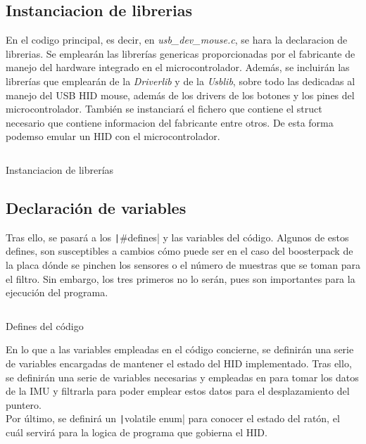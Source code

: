 \documentclass[a4paper,twoside]{article}
\begin{document}
\subsection{Instanciacion de librerias}
En el codigo principal, es decir, en \textit{usb\_dev\_mouse.c}, se hara la declaracion de librerias. Se emplearán las librerías genericas proporcionadas por el fabricante de manejo del hardware integrado en el microcontrolador. Además, se incluirán las librerías que emplearán de la \textit{Driverlib} y de la \textit{Usblib}, sobre todo las dedicadas al manejo del USB HID mouse, además de los drivers de los botones y los pines del microcontrolador. También se instanciará el fichero que contiene el struct necesario que contiene informacion del fabricante entre otros. De esta forma podemso emular un HID con el microcontrolador.
\begin{listing}[h!]
\inputminted[linenos,breaklines,frame=lines,framesep=2mm]{c}{codes/librerias.c}
\caption{Instanciacion de librerías}
\end{listing}

\newpage
\subsection{Declaración de variables}
Tras ello, se pasará a los \texttt|#defines| y las variables del código. Algunos de estos defines, son susceptibles a cambios cómo puede ser en el caso del boosterpack de la placa dónde se pinchen los sensores o el número de muestras que se toman para el filtro. Sin embargo, los tres primeros no lo serán, pues son importantes para la ejecución del programa.
\begin{listing}[h!]
\inputminted[linenos,breaklines,frame=lines,framesep=2mm]{c}{codes/defines.c}
\caption{Defines del código}
\end{listing}

En lo que a las variables empleadas en el código concierne, se definirán una serie de variables encargadas de mantener el estado del HID implementado. Tras ello, se definirán una serie de variables necesarias y empleadas en para tomar los datos de la IMU y filtrarla para poder emplear estos datos para el desplazamiento del puntero.\\
Por último, se definirá un \texttt|volatile enum| para conocer el estado del ratón, el cuál servirá para la logica de programa que gobierna el HID.
\begin{mdframed}[linecolor=black, topline=false, bottomline=false, leftline=false, rightline=false]
\inputminted[linenos,breaklines,frame=lines,framesep=2mm]{c}{codes/variables1.c}
\end{mdframed}
\end{document}
